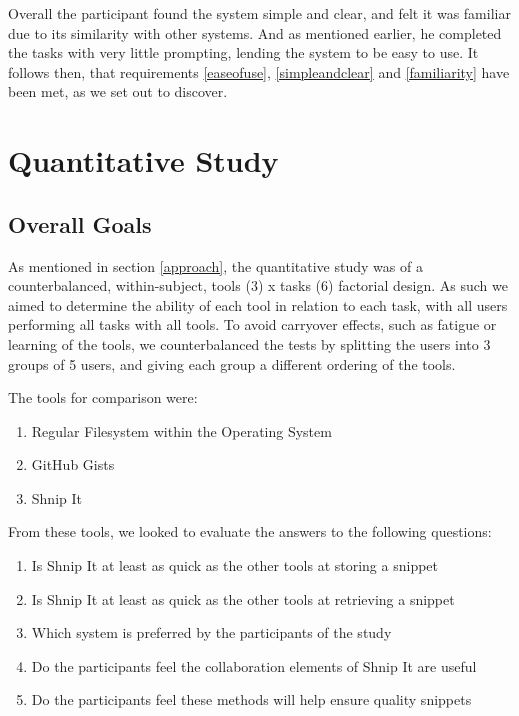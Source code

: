 Overall the participant found the system simple and clear, and felt it was familiar due to its similarity with other systems.
And as mentioned earlier, he completed the tasks with very little prompting, lending the system to be easy to use. 
It follows then, that requirements \ref{easeofuse}, \ref{simpleandclear} and \ref{familiarity} have been met, as we set out to discover. 


\section{Quantitative Study} \label{quantitativestudy}
\subsection{Overall Goals} \label{overallgoals}
As mentioned in section \ref{approach}, the quantitative study was of a counterbalanced, within-subject, tools (3) x tasks (6) factorial design. 
As such we aimed to determine the ability of each tool in relation to each task, with all users performing all tasks with all tools.
To avoid carryover effects, such as fatigue or learning of the tools, we counterbalanced the tests by splitting the users into 3 groups of 5 users, and giving each group a different ordering of the tools.

The tools for comparison were:
\begin{enumerate}
\item Regular Filesystem within the Operating System
\item GitHub Gists
\item Shnip It
\end{enumerate}

From these tools, we looked to evaluate the answers to the following questions:

\begin{enumerate}
\item Is Shnip It at least as quick as the other tools at storing a snippet
\item Is Shnip It at least as quick as the other tools at retrieving a snippet
\item Which system is preferred by the participants of the study
\item Do the participants feel the collaboration elements of Shnip It are useful
\item Do the participants feel these methods will help ensure quality snippets
\end{enumerate}

